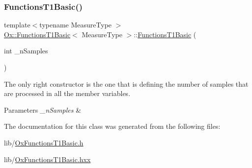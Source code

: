 \subsubsection{\texorpdfstring{Functions\+T1\+Basic()}{FunctionsT1Basic()}}
{\footnotesize\ttfamily template$<$typename Measure\+Type $>$ \\
\mbox{\hyperlink{class_ox_1_1_functions_t1_basic}{Ox\+::\+Functions\+T1\+Basic}}$<$ Measure\+Type $>$\+::\mbox{\hyperlink{class_ox_1_1_functions_t1_basic}{Functions\+T1\+Basic}} (\begin{DoxyParamCaption}\item[{int}]{\+\_\+n\+Samples }\end{DoxyParamCaption})\hspace{0.3cm}{\ttfamily [inline]}}



The only right constructor is the one that is defining the number of samples that are processed in all the member variables. 


\begin{DoxyParams}{Parameters}
{\em \+\_\+n\+Samples} & \\
\hline
\end{DoxyParams}


The documentation for this class was generated from the following files\+:\begin{DoxyCompactItemize}
\item 
lib/\mbox{\hyperlink{_ox_functions_t1_basic_8h}{Ox\+Functions\+T1\+Basic.\+h}}\item 
lib/\mbox{\hyperlink{_ox_functions_t1_basic_8hxx}{Ox\+Functions\+T1\+Basic.\+hxx}}\end{DoxyCompactItemize}
